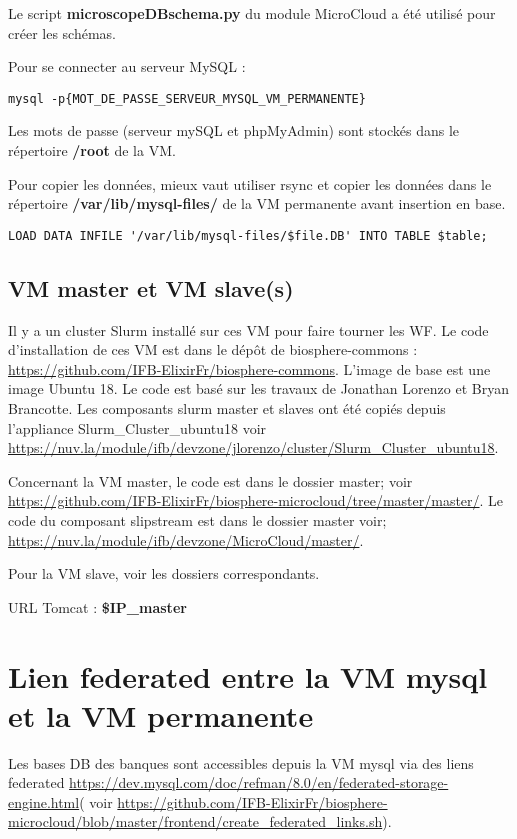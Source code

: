 Le script \textbf{microscopeDBschema.py} du module MicroCloud a été utilisé pour créer les schémas.
\newline

Pour se connecter au serveur MySQL :
\begin{lstlisting}[style=bash]
mysql -p{MOT_DE_PASSE_SERVEUR_MYSQL_VM_PERMANENTE}
\end{lstlisting}

Les mots de passe (serveur mySQL et phpMyAdmin) sont stockés dans le répertoire \textbf{/root} de la VM.
\newline 

Pour copier les données, mieux vaut utiliser rsync et copier les données dans le répertoire \textbf{/var/lib/mysql-files/} de la VM permanente avant insertion en base.

\begin{lstlisting}[style=bash]
LOAD DATA INFILE '/var/lib/mysql-files/$file.DB' INTO TABLE $table;
\end{lstlisting}

\subsection{VM master et VM slave(s)} \label{master&slave}

Il y a un cluster Slurm installé sur ces VM pour faire tourner les WF. Le code d’installation de ces VM est dans le dépôt de biosphere-commons : \url{https://github.com/IFB-ElixirFr/biosphere-commons}.
L'image de base est une image Ubuntu 18.
Le code est basé sur les travaux de Jonathan Lorenzo et Bryan Brancotte.
Les composants slurm master et slaves ont été copiés depuis l'appliance Slurm\_Cluster\_ubuntu18 voir \url{https://nuv.la/module/ifb/devzone/jlorenzo/cluster/Slurm_Cluster_ubuntu18}.

Concernant la VM master, le code est dans le dossier master; voir
\url{https://github.com/IFB-ElixirFr/biosphere-microcloud/tree/master/master/}.
Le code du composant slipstream est dans le dossier master voir; \url{https://nuv.la/module/ifb/devzone/MicroCloud/master/}.

Pour la VM slave, voir les dossiers correspondants.\newline

URL Tomcat : \textbf{\$IP\_master}

\section{Lien federated entre la VM mysql et  la VM permanente}
Les bases DB des banques sont accessibles depuis la VM mysql via des liens federated \url{https://dev.mysql.com/doc/refman/8.0/en/federated-storage-engine.html}( 
voir \url{https://github.com/IFB-ElixirFr/biosphere-microcloud/blob/master/frontend/create_federated_links.sh}).
\bigskip

